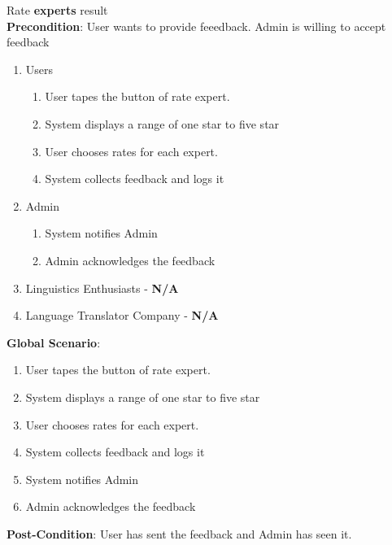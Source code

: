 \item Rate \textbf{experts} result  \\
\textbf{Precondition}: User wants to provide feeedback. Admin is willing to accept feedback
	\begin{enumerate}[{\bf VP1.}]
		\item Users
		\begin{enumerate}[{\bf 1.}]
			\item User tapes the button of rate expert.
			\item System displays a range of one star to five star
			\item User chooses rates for each expert.
			\item System collects feedback and logs it
		\end{enumerate}
		\item Admin
		\begin{enumerate}[{\bf 1.}]
			\item System notifies Admin
			\item Admin acknowledges the feedback
		\end{enumerate}
		\item Linguistics Enthusiasts - \textbf{N/A}
		\item Language Translator Company - \textbf{N/A}
	\end{enumerate}
\textbf{Global Scenario}:
\begin{enumerate}[{\bf 1.}]
	\item User tapes the button of rate expert.
	\item System displays a range of one star to five star
	\item User chooses rates for each expert.
	\item System collects feedback and logs it
	\item System notifies Admin
	\item Admin acknowledges the feedback
\end{enumerate}
\textbf{Post-Condition}: User has sent the feedback and Admin has seen it.